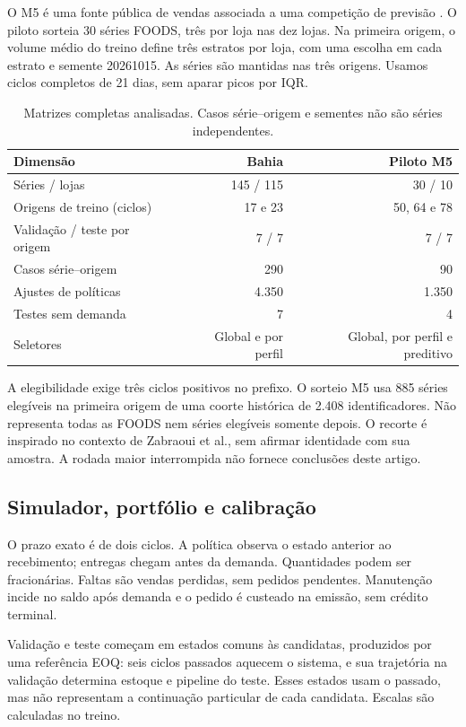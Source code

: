 \documentclass[preprint,12pt]{elsarticle}
\begin{document}
O M5 é uma fonte pública de vendas associada a uma competição de previsão \cite{Makridakis2022M5Accuracy}. O piloto sorteia 30 séries FOODS, três por loja nas dez lojas. Na primeira origem, o volume médio do treino define três estratos por loja, com uma escolha em cada estrato e semente 20261015. As séries são mantidas nas três origens. Usamos ciclos completos de 21 dias, sem aparar picos por IQR.

\begin{table}[htbp]\centering\small
\caption{Matrizes completas analisadas. Casos série--origem e sementes não são séries independentes.}\label{tab:datasets}
\begin{tabular}{@{}lrr@{}}\toprule
Dimensão & Bahia & Piloto M5\\\midrule
Séries / lojas & 145 / 115 & 30 / 10\\
Origens de treino (ciclos) & 17 e 23 & 50, 64 e 78\\
Validação / teste por origem & 7 / 7 & 7 / 7\\
Casos série--origem & 290 & 90\\
Ajustes de políticas & 4.350 & 1.350\\
Testes sem demanda & 7 & 4\\
Seletores & Global e por perfil & Global, por perfil e preditivo\\\bottomrule
\end{tabular}\end{table}

A elegibilidade exige três ciclos positivos no prefixo. O sorteio M5 usa 885 séries elegíveis na primeira origem de uma coorte histórica de 2.408 identificadores. Não representa todas as FOODS nem séries elegíveis somente depois. O recorte é inspirado no contexto de Zabraoui et al., sem afirmar identidade com sua amostra. A rodada maior interrompida não fornece conclusões deste artigo.

\subsection{Simulador, portfólio e calibração}
O prazo exato é de dois ciclos. A política observa o estado anterior ao recebimento; entregas chegam antes da demanda. Quantidades podem ser fracionárias. Faltas são vendas perdidas, sem pedidos pendentes. Manutenção incide no saldo após demanda e o pedido é custeado na emissão, sem crédito terminal.

Validação e teste começam em estados comuns às candidatas, produzidos por uma referência EOQ: seis ciclos passados aquecem o sistema, e sua trajetória na validação determina estoque e pipeline do teste. Esses estados usam o passado, mas não representam a continuação particular de cada candidata. Escalas são calculadas no treino.
\end{document}
